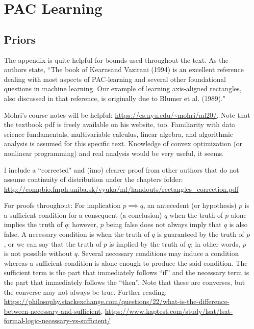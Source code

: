 \chapter{PAC Learning}

\section{Priors}

The appendix is quite helpful for bounds used throughout the text. As the
authors state, ``The book of Kearnsand Vazirani (1994) is an excellent
reference dealing with most aspects of PAC-learning and several other
foundational questions in machine learning. Our example
of learning axis-aligned rectangles, also discussed in that reference, is
originally due to Blumer et al. (1989)."

Mohri's course notes will be helpful: \url{https://cs.nyu.edu/~mohri/ml20/}.
Note that the textbook pdf is freely available on his website, too. Familiarity
with data science fundamentals, multivariable calculus, linear algebra, and
algorithmic analysis is assumed for this specific text. Knowledge of convex
optimization (or nonlinear programming) and real analysis would be very useful,
it seems.

I include a ``corrected" and (imo) clearer proof from other authors that do not
assume continuity of distribution under the chapters folder:
\url{http://compbio.fmph.uniba.sk/vyuka/ml/handouts/rectangles_correction.pdf}

For proofs throughout: For implication $p \implies q$, an antecedent (or
hypothesis) $p$ is a sufficient condition for a consequent (a conclusion) $q$
when the truth of $p$ alone implies the truth of $q$; however, $p$ being false
does not always imply that $q$ is also false. A necessary condition is when the
truth of $q$ is guaranteed by the truth of $p$, or we can say that the truth of
$p$ is implied
by the truth of $q$; in other words, $p$ is not possible without $q$. Several
necessary conditions may induce a condition whereas a sufficient condition is
alone enough to produce the said condition. The sufficient term is the part
that immediately follows ``if'' and the necessary term is the part that
immediately
follows the ``then''. Note that these are converses, but the converse may not
always be true. Further reading:
\url{https://philosophy.stackexchange.com/questions/22/what-is-the-difference-between-necessary-and-sufficient},
\url{https://www.kaptest.com/study/lsat/lsat-formal-logic-necessary-vs-sufficient/}

